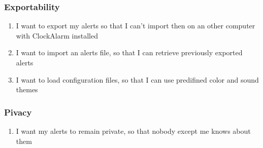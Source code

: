 \subsubsection{Exportability}
\begin{enumerate}[resume]
	\item I want to export my alerts so that I can't import then on an other computer with ClockAlarm installed
	\item I want to import an alerts file, so that I can retrieve previously exported alerts
	\item I want to load configuration files, so that I can use predifined color and sound themes
\end{enumerate}
\subsubsection{Pivacy}
\begin{enumerate}[resume]
	\item I want my alerts to remain private, so that nobody except me knows about them
\end{enumerate}